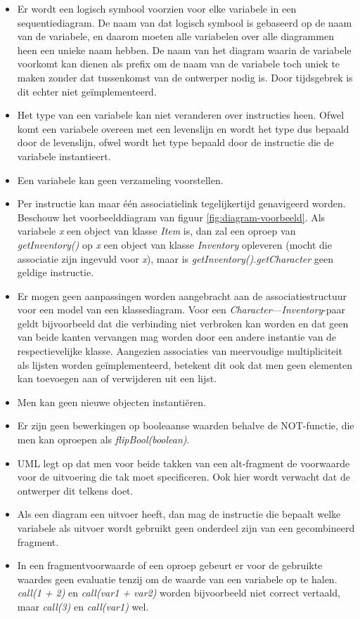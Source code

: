 \begin{itemize}
	\item Er wordt een logisch symbool voorzien voor elke variabele in een sequentiediagram. De naam van dat logisch symbool is gebaseerd op de naam van de variabele, en daarom moeten alle variabelen over alle diagrammen heen een unieke naam hebben. De naam van het diagram waarin de variabele voorkomt kan dienen als prefix om de naam van de variabele toch uniek te maken zonder dat tussenkomst van de ontwerper nodig is. Door tijdsgebrek is dit echter niet ge\"implementeerd.
	\item Het type van een variabele kan niet veranderen over instructies heen. Ofwel komt een variabele overeen met een levenslijn en wordt het type dus bepaald door de levenslijn, ofwel wordt het type bepaald door de instructie die de variabele instantieert.
	\item Een variabele kan geen verzameling voorstellen.
	\item Per instructie kan maar \'e\'en associatielink tegelijkertijd genavigeerd worden. Beschouw het voorbeelddiagram van figuur \ref{fig:diagram-voorbeeld}. Als variabele \textit{x} een object van klasse \textit{Item} is, dan zal een oproep van \textit{getInventory()} op \textit{x} een object van klasse \textit{Inventory} opleveren (mocht die associatie zijn ingevuld voor \textit{x}), maar is \textit{getInventory().getCharacter} geen geldige instructie.
	\item Er mogen geen aanpassingen worden aangebracht aan de associatiestructuur voor een model van een klassediagram. Voor een \textit{Character}---\textit{Inventory}-paar geldt bijvoorbeeld dat die verbinding niet verbroken kan worden en dat geen van beide kanten vervangen mag worden door een andere instantie van de respectievelijke klasse. Aangezien associaties van meervoudige multipliciteit als lijsten worden ge\"implementeerd, betekent dit ook dat men geen elementen kan toevoegen aan of verwijderen uit een lijst.
	\item Men kan geen nieuwe objecten instanti\"eren.
	\item Er zijn geen bewerkingen op booleaanse waarden behalve de NOT-functie, die men kan oproepen als \textit{flipBool(boolean)}.
	\item UML legt op dat men voor beide takken van een alt-fragment de voorwaarde voor de uitvoering die tak moet specificeren. Ook hier wordt verwacht dat de ontwerper dit telkens doet.
	\item Als een diagram een uitvoer heeft, dan mag de instructie die bepaalt welke variabele als uitvoer wordt gebruikt geen onderdeel zijn van een gecombineerd fragment.
	\item In een fragmentvoorwaarde of een oproep gebeurt er voor de gebruikte waardes geen evaluatie tenzij om de waarde van een variabele op te halen. \textit{call(1 + 2)} en \textit{call(var1 + var2)} worden bijvoorbeeld niet correct vertaald, maar \textit{call(3)} en \textit{call(var1)} wel.
\end{itemize}

